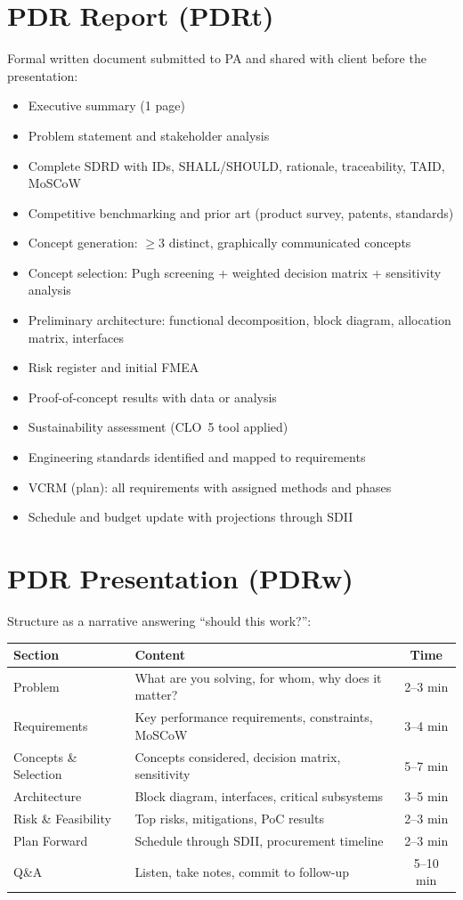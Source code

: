 \section{PDR Report (PDRt)}
Formal written document submitted to PA and shared with client before the presentation:
\begin{itemize}[nosep,leftmargin=1.5em]
\item Executive summary (1 page)
\item Problem statement and stakeholder analysis
\item Complete SDRD with IDs, SHALL/SHOULD, rationale, traceability, TAID, MoSCoW
\item Competitive benchmarking and prior art (product survey, patents, standards)
\item Concept generation: $\geq$3 distinct, graphically communicated concepts
\item Concept selection: Pugh screening + weighted decision matrix + sensitivity analysis
\item Preliminary architecture: functional decomposition, block diagram, allocation matrix, interfaces
\item Risk register and initial FMEA
\item Proof-of-concept results with data or analysis
\item Sustainability assessment (CLO~5 tool applied)
\item Engineering standards identified and mapped to requirements
\item VCRM (plan): all requirements with assigned methods and phases
\item Schedule and budget update with projections through SDII
\end{itemize}

\section{PDR Presentation (PDRw)}
Structure as a narrative answering ``should this work?'':

\begin{center}\small
\begin{tabularx}{\textwidth}{lXc}
\toprule
\textbf{Section} & \textbf{Content} & \textbf{Time} \\
\midrule
Problem & What are you solving, for whom, why does it matter? & 2--3 min \\
Requirements & Key performance requirements, constraints, MoSCoW & 3--4 min \\
Concepts \& Selection & Concepts considered, decision matrix, sensitivity & 5--7 min \\
Architecture & Block diagram, interfaces, critical subsystems & 3--5 min \\
Risk \& Feasibility & Top risks, mitigations, PoC results & 2--3 min \\
Plan Forward & Schedule through SDII, procurement timeline & 2--3 min \\
Q\&A & Listen, take notes, commit to follow-up & 5--10 min \\
\bottomrule
\end{tabularx}
\end{center}

